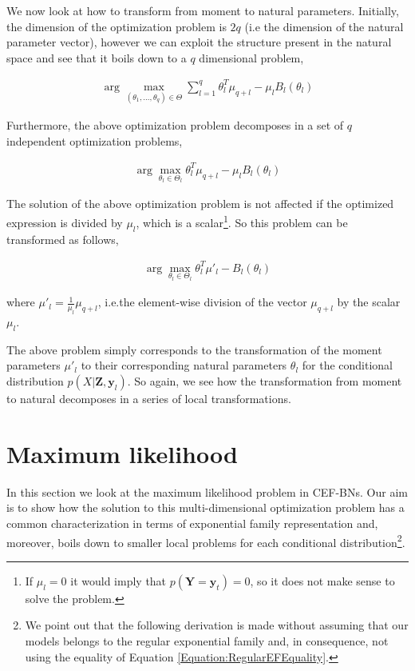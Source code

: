 \documentclass[11pt, oneside]{article}   	%
\newcommand{\bm}{\mathbf}
\numberwithin{figure}{section}
\numberwithin{equation}{section}
\numberwithin{table}{section}
\theoremstyle{definition}
\begin{document}
We now look at how to transform from moment to natural parameters. Initially, the dimension of the optimization problem is $2q$ (i.e the dimension of the natural parameter vector), however we can exploit the structure present in the natural space and see that it boils down to a $q$ dimensional problem, 

\begin{eqnarray*}
\arg\max_{(\theta_1,\ldots, \theta_q) \in \Theta} \sum_{l=1}^q \theta_l^T \mu_{q+l}- \mu_l B_l(\theta_l)
\end{eqnarray*}

Furthermore, the above optimization problem decomposes in a set of $q$ independent optimization problems, 

\begin{eqnarray*}
\arg\max_{\theta_l \in \Theta_l} \theta_l^T \mu_{q+l}- \mu_l B_l(\theta_l)
\end{eqnarray*}

The solution of the above optimization problem is not affected if the optimized expression is divided by $\mu_l$, which is a scalar\footnote{If $\mu_l=0$ it would imply that $p(\bm Y= \bm y_t)=0$, so it does not make sense to solve the problem.}. So this problem can be transformed as follows, 

\begin{eqnarray}
\label{Equation:CD_With_MParents:MomentToNatural}
\arg\max_{\theta_l \in \Theta_l} \theta_l^T\mu'_l - B_l(\theta_l)
\end{eqnarray}

\noindent where $\mu'_l =\frac{1}{\mu_{l}}\mu_{q+l}$, i.e.the element-wise division of the vector $\mu_{q+l}$ by the scalar $\mu_l$.

The above problem simply corresponds to the transformation of the moment parameters $\mu'_l$ to their corresponding natural parameters $\theta_l$ for the conditional distribution $p(X|\bm Z, \bm y_l)$. So again, we see how the transformation from moment to natural decomposes in a series of local transformations. 

\section{Maximum likelihood}

In this section we look at the maximum likelihood problem in CEF-BNs. Our aim is to show how the solution to this multi-dimensional optimization problem has a common characterization in terms of exponential family representation and, moreover, boils down to smaller local problems for each conditional distribution\footnote{We point out that the following derivation is made without assuming that our models belongs to the regular exponential family and, in consequence, not using the equality of Equation \ref{Equation:RegularEFEquality}.}.
\end{document}
